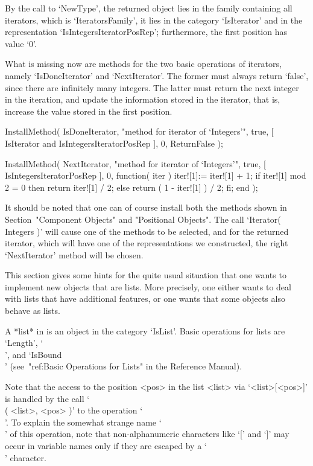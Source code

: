 By the call to `NewType', the returned object lies in the family
containing all iterators, which is `IteratorsFamily',
it lies in the category `IsIterator' and in the representation
`IsIntegersIteratorPosRep';
furthermore, the first position has value `0'.

What is missing now are methods for the two basic operations
of iterators, namely `IsDoneIterator' and `NextIterator'.
The former must always return `false', since there are infinitely
many integers.
The latter must return the next integer in the iteration,
and update the information stored in the iterator,
that is, increase the value stored in the first position.

\begintt
InstallMethod( IsDoneIterator,
    "method for iterator of `Integers'",
    true,
    [ IsIterator and IsIntegersIteratorPosRep ], 0,
    ReturnFalse );

InstallMethod( NextIterator,
    "method for iterator of `Integers'",
    true,
    [ IsIntegersIteratorPosRep ], 0,
    function( iter )
    iter![1]:= iter![1] + 1;
    if iter![1] mod 2 = 0 then
      return iter![1] / 2;
    else
      return ( 1 - iter![1] ) / 2;
    fi;
    end );
\endtt

It should be noted that one can of course install both the methods shown
in Section~"Component Objects" and "Positional Objects".
The call `Iterator( Integers )' will cause one of the methods to be
selected, and for the returned iterator, which will have one of the
representations we constructed, the right `NextIterator' method
will be chosen.


This section gives some hints for the quite usual situation that one wants
to implement new objects that are lists.
More precisely, one either wants to deal with lists that have additional
features, or one wants that some objects also behave as lists.

A *list* in {\GAP} is an object in the category `IsList'.
Basic operations for lists are `Length', `\\[\\]', and `IsBound\\[\\]'
(see~"ref:Basic Operations for Lists" in the Reference Manual).

Note that the access to the position <pos> in the list <list>
via `<list>[<pos>]' is handled by the call `\\[\\]( <list>, <pos> )'
to the operation `\\[\\]'.
To explain the somewhat strange name `\\[\\]' of this operation,
note that non-alphanumeric characters like `[' and `]' may occur in
{\GAP} variable names only if they are escaped by a `\\' character.

